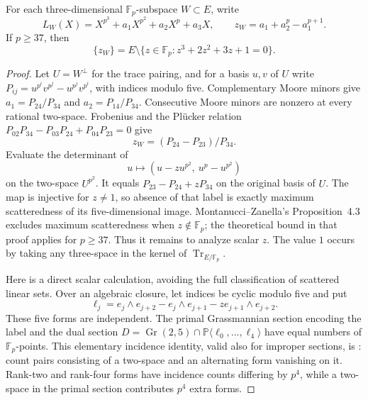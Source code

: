 \begin{lemma}\label{lem:d5-exact-native-labels}
For each three-dimensional $\mathbb F_p$-subspace $W\subset E$, write
\[
 L_W(X)=X^{p^3}+a_1X^{p^2}+a_2X^p+a_3X,
 \qquad z_W=a_1+a_2^p-a_1^{p+1}.
\]
If $p\ge37$, then
\[
 \{z_W\}=E\setminus\{z\in\mathbb F_p:z^3+2z^2+3z+1=0\}.
\]
\end{lemma}
\begin{proof}
Let $U=W^\perp$ for the trace pairing, and for a basis $u,v$ of $U$ write
$P_{ij}=u^{p^i}v^{p^j}-u^{p^j}v^{p^i}$, with indices modulo five.
Complementary Moore minors give
$a_1=P_{24}/P_{34}$ and $a_2=P_{14}/P_{34}$.
Consecutive Moore minors are nonzero at every rational two-space.
Frobenius and the Pl\"ucker relation
$P_{02}P_{34}-P_{03}P_{24}+P_{04}P_{23}=0$ give
\[
 z_W=(P_{24}-P_{23})/P_{34}.
\]
Evaluate the determinant of
\[
 u\longmapsto (u-zu^{p^2},\ u^p-u^{p^2})
\]
on the two-space $U^{p^2}$. It equals
$P_{23}-P_{24}+zP_{34}$ on the original basis of $U$.
The map is injective for $z\ne1$, so absence of that label is
exactly maximum scatteredness of its five-dimensional image.
Montanucci--Zanella's Proposition~4.3 \cite{mz2022-linearsets} excludes maximum scatteredness when $z\notin\mathbb F_p$; the theoretical bound in that proof applies for $p\ge37$.  Thus it remains to analyze scalar $z$.  The value $1$ occurs by taking any three-space in the kernel of $\operatorname{Tr}_{E/\mathbb F_p}$.

Here is a direct scalar calculation, avoiding the full classification of scattered linear sets.  Over an algebraic closure, let indices be cyclic modulo five and put
\[
 \ell_j=e_j\wedge e_{j+2}-e_j\wedge e_{j+1}
                 -z e_{j+1}\wedge e_{j+2}.
\]
These five forms are independent. The primal Grassmannian section encoding the label and the dual section
$D=\operatorname{Gr}(2,5)\cap\mathbb P\langle\ell_0,\ldots,\ell_4\rangle$
have equal numbers of $\mathbb F_p$-points. This elementary incidence identity, valid also for improper sections, is \cite[Lemma~2.3]{lu2026-scattered}: count pairs consisting of a two-space and an alternating form vanishing on it. Rank-two and rank-four forms have incidence counts differing by $p^4$, while a two-space in the primal section contributes $p^4$ extra forms.


\end{proof}
